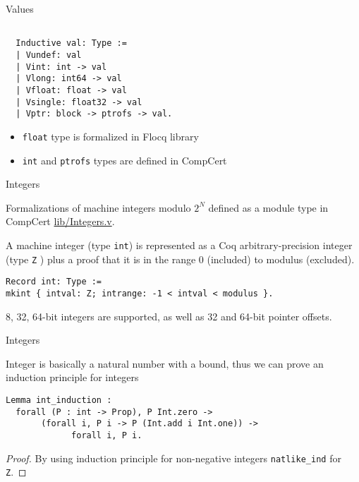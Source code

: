 \documentclass{beamer}
\begin{document}
\begin{frame}[t,fragile]{Values}
  
\begin{lstlisting}[language=Coq]

  Inductive val: Type :=
  | Vundef: val
  | Vint: int -> val
  | Vlong: int64 -> val
  | Vfloat: float -> val
  | Vsingle: float32 -> val
  | Vptr: block -> ptrofs -> val.
\end{lstlisting}

\begin{itemize}
\item \texttt{float} type is formalized in Flocq library
\item \texttt{int} and \texttt{ptrofs} types are defined in CompCert 
\end{itemize}
  
\end{frame}  


\begin{frame}[t,fragile]{Integers}

Formalizations of machine integers modulo $2^N$ defined as a module type in CompCert \url{lib/Integers.v}.\\

\bigskip

A machine integer (type \texttt{int}) is represented as a Coq arbitrary-precision
integer (type \texttt{Z} ) plus a proof that it is in the range 0 (included) to
modulus (excluded).

\bigskip

\begin{lstlisting}[language=Coq]
Record int: Type :=
mkint { intval: Z; intrange: -1 < intval < modulus }.
\end{lstlisting}

8, 32, 64-bit integers are supported, as well as 32 and 64-bit pointer offsets.

\end{frame}

\begin{frame}[t,fragile]{Integers}

 Integer is basically a natural number with a bound, thus we can prove an induction principle for integers

\bigskip

\begin{lstlisting}[language=Coq]
  Lemma int_induction :
  forall (P : int -> Prop), P Int.zero ->
       (forall i, P i -> P (Int.add i Int.one)) ->
             forall i, P i.
\end{lstlisting}

 \begin{proof}

   By using induction principle for non-negative integers \texttt{natlike\_ind} for \texttt{Z}.
                                       
 \end{proof}



\end{frame}
\end{document}
